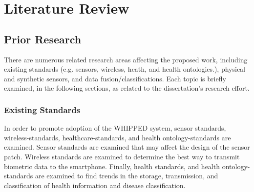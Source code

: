 \chapter{Literature Review}
\label{chap:LitReview}

\section{Prior Research}
\label{sec:priorResearch}
There are numerous related research areas affecting the proposed work, including existing standards (e.g. sensors, wireless, heath, and health ontologies.), physical and synthetic sensors, and data fusion/classifications. Each topic is briefly examined, in the following sections, as related to the dissertation's research effort.

\subsection{Existing Standards}
\label{sebsec:ExistingStandards}
In order to promote adoption of the WHIPPED system, sensor standards, wireless-standards, healthcare-standards, and health ontology-standards are examined. Sensor standards are examined that may affect the design of the sensor patch. Wireless standards are examined to determine the best way to transmit biometric data to the smartphone. Finally, health standards, and health ontology-standards are examined to find trends in the storage, transmission, and classification of health information and disease classification.

